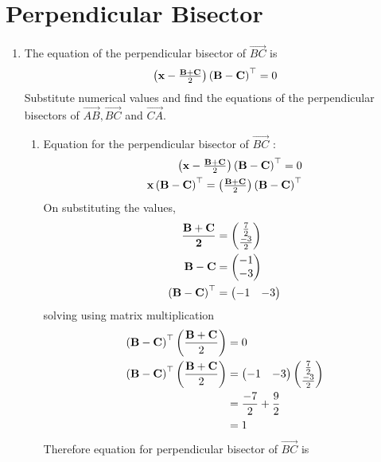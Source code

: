 \documentclass[10pt]{book}
\begin{document}
\section{Perpendicular Bisector}
\begin{enumerate}[label=\thesection.\arabic*.,ref=\thesection.\theenumi]

\item The equation of the perpendicular bisector of $\vec{BC}$ is
\begin{align}
\label{eq:tri-perp-bisect}
\myvec{\vec{x}-\frac{\vec{B}+\vec{C}}{2}}\brak{\vec{B}-\vec{C}}^{\top} = 0
\end{align}
Substitute numerical values and find the equations of the perpendicular bisectors of $\vec{AB}, \vec{BC}$ and $\vec{CA}$.\\
\solution
\begin{enumerate}
\item  Equation for the perpendicular bisector of $\vec{BC}$ :
\begin{align}
    \begin{pmatrix}\mathbf{x}-\frac{\mathbf{B}+\mathbf{C}}{2}\end{pmatrix}\left(\mathbf{B}-\mathbf{C}\right)^{\top} = 0 \\
    \mathbf{x}\left(\mathbf{B} - \mathbf{C}\right)^{\top}= \begin{pmatrix}\frac{\mathbf{B}+\mathbf{C}}{2}\end{pmatrix}\left(\mathbf{B}-\mathbf{C}\right)^{\top}
\end{align}
On substituting the values,
\begin{align}
    \mathbf{\frac{\mathbf{B}+\mathbf{C}}{2}} &= \begin{pmatrix}\frac{7}{2} \\ \frac{-3}{2}\end{pmatrix} \\
    \mathbf{B}-\mathbf{C} &= \begin{pmatrix}-1\\ -3\end{pmatrix} \\
    \left(\mathbf{B}-\mathbf{C}\right)^{\top} &= \begin{pmatrix}-1 & -3\end{pmatrix}
\end{align}
solving using matrix multiplication
\begin{align}
\left(\mathbf{B}-\mathbf{C}\right)^{\top}\left(\frac{\mathbf{B}+\mathbf{C}}{2}\right)&=0\\
\left(\mathbf{B}-\mathbf{C}\right)^{\top}\left(\frac{\mathbf{B}+\mathbf{C}}{2}\right)&=\begin{pmatrix}-1 & -3\end{pmatrix}\begin{pmatrix}\frac{7}{2} \\ \frac{-3}{2}\end{pmatrix}\\
&= \frac{-7}{2} + \frac{9}{2} \\
& =1
\end{align}
Therefore equation for perpendicular bisector of $\vec{BC}$ is
\begin{align}

\end{align}
\end{enumerate}
\end{enumerate}
\end{document}
